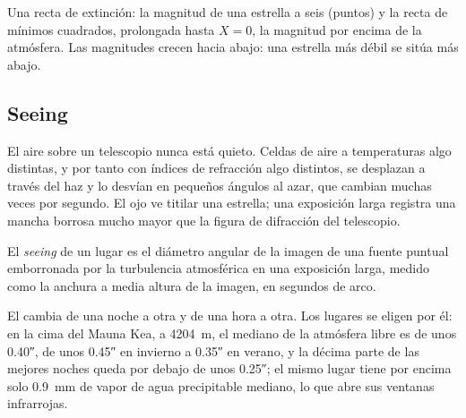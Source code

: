 \begin{omfigure}

{\small Una recta de extinción: la magnitud de una estrella a seis 
(puntos) y la recta de mínimos cuadrados, prolongada hasta $X = 0$, la magnitud por
encima de la atmósfera. Las magnitudes crecen hacia abajo: una estrella más débil se
sitúa más abajo.}
\end{omfigure}

\subsection*{Seeing}

El aire sobre un telescopio nunca está quieto. Celdas de aire a temperaturas algo
distintas, y por tanto con índices de refracción algo distintos, se desplazan a
través del haz y lo desvían en pequeños ángulos al azar, que cambian muchas veces por
segundo. El ojo ve titilar una estrella; una exposición larga registra una mancha
borrosa mucho mayor que la figura de difracción del telescopio.

\begin{definition}[Seeing]\label{def:b1:observing-the-sky:seeing}
El \emph{seeing} de un lugar es el diámetro angular de la imagen de una
fuente puntual emborronada por la turbulencia atmosférica en una exposición larga,
medido como la anchura a media altura de la imagen, en segundos de arco.
\end{definition}

El  cambia de una noche a otra y de una hora a otra. Los lugares se eligen por
él: en la cima del Mauna Kea, a \qty{4204}{m}, el  mediano de la atmósfera libre
es de unos \ang{;;0.40}, de unos \ang{;;0.45} en invierno a \ang{;;0.35} en verano, y la
décima parte de las mejores noches queda por debajo de unos \ang{;;0.25}; el mismo lugar
tiene por encima solo \qty{0.9}{mm} de vapor de agua precipitable mediano, lo que abre
sus ventanas infrarrojas.

